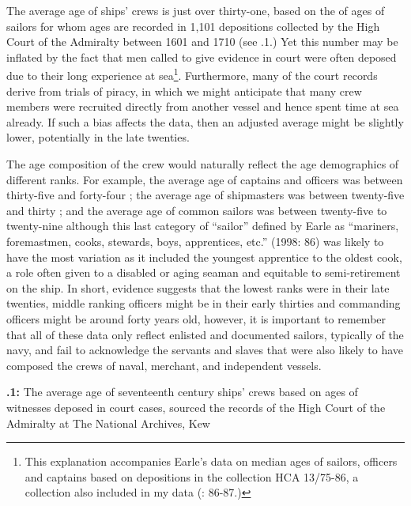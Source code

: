  The average age of ships’ crews is just over thirty-one, based on the of ages of sailors for whom ages are recorded in 1,101 depositions collected by the High Court of the Admiralty between 1601 and 1710 (see .1.) Yet this number may be inflated by the fact that men called to give evidence in court were often deposed due to their long experience at sea\footnote{This explanation accompanies Earle’s data on median ages of sailors, officers and captains based on depositions in the collection HCA 13/75-86, a collection also included in my data (\citealt{Earle1993}: 86-87.)}. Furthermore, many of the court records derive from trials of piracy, in which we might anticipate that many crew members were recruited directly from another vessel and hence spent time at sea already. If such a bias affects the data, then an adjusted average might be slightly lower, potentially in the late twenties.

The age composition of the crew would naturally reflect the age demographics of different ranks. For example, the average age of captains and officers was between thirty-five and forty-four \citep[86]{Earle1998}; the average age of shipmasters was between twenty-five and thirty \citep[38-39]{Walsh1994}; and the average age of common sailors was between twenty-five to twenty-nine \citep[86,]{Earle1998} although this last category of “sailor” defined by Earle as “mariners, foremastmen, cooks, stewards, boys, apprentices, etc.” (1998: 86) was likely to have the most variation as it included the youngest apprentice to the oldest cook, a role often given to a disabled or aging seaman and equitable to semi-retirement on the ship. In short, evidence suggests that the lowest ranks were in their late twenties, middle ranking officers might be in their early thirties and commanding officers might be around forty years old, however, it is important to remember that all of these data only reflect enlisted and documented sailors, typically of the navy, and fail to acknowledge the servants and slaves that were also likely to have composed the crews of naval, merchant, and independent vessels. 

\textbf{.1:} The average age of seventeenth century ships’ crews based on ages of witnesses deposed in court cases, sourced the records of the High Court of the Admiralty at The National Archives, Kew 

\tablefirsthead{}

